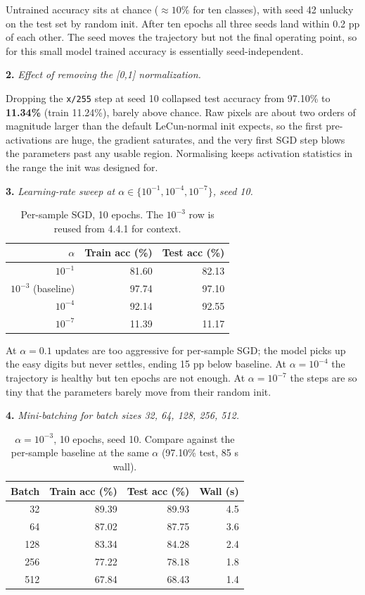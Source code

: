 \documentclass[11pt,a4paper]{article}
\newcommand{\Qpart}[1]{\textbf{#1.}}
\begin{document}
Untrained accuracy sits at chance ($\approx 10\%$ for ten classes), with seed 42 unlucky on the test set by random init. After ten epochs all three seeds land within 0.2 pp of each other. The seed moves the trajectory but not the final operating point, so for this small model trained accuracy is essentially seed-independent.

\Qpart{2} \textit{Effect of removing the [0,1] normalization.}

Dropping the \texttt{x/255} step at seed 10 collapsed test accuracy from 97.10\% to \textbf{11.34\%} (train 11.24\%), barely above chance. Raw pixels are about two orders of magnitude larger than the default LeCun-normal init expects, so the first pre-activations are huge, the gradient saturates, and the very first SGD step blows the parameters past any usable region. Normalising keeps activation statistics in the range the init was designed for.

\Qpart{3} \textit{Learning-rate sweep at \(\alpha \in \{10^{-1}, 10^{-4}, 10^{-7}\}\), seed 10.}

\begin{table}[h]
\centering
\small
\begin{tabular}{rrr}
\toprule
$\alpha$ & Train acc (\%) & Test acc (\%) \\
\midrule
$10^{-1}$ & 81.60 & 82.13 \\
$10^{-3}$ (baseline) & 97.74 & 97.10 \\
$10^{-4}$ & 92.14 & 92.55 \\
$10^{-7}$ & 11.39 & 11.17 \\
\bottomrule
\end{tabular}
\caption{Per-sample SGD, 10 epochs. The $10^{-3}$ row is reused from 4.4.1 for context.}
\end{table}

At $\alpha = 0.1$ updates are too aggressive for per-sample SGD; the model picks up the easy digits but never settles, ending 15 pp below baseline. At $\alpha = 10^{-4}$ the trajectory is healthy but ten epochs are not enough. At $\alpha = 10^{-7}$ the steps are so tiny that the parameters barely move from their random init.

\Qpart{4} \textit{Mini-batching for batch sizes 32, 64, 128, 256, 512.}

\begin{table}[h]
\centering
\small
\begin{tabular}{rrrr}
\toprule
Batch & Train acc (\%) & Test acc (\%) & Wall (s) \\
\midrule
32  & 89.39 & 89.93 & 4.5 \\
64  & 87.02 & 87.75 & 3.6 \\
128 & 83.34 & 84.28 & 2.4 \\
256 & 77.22 & 78.18 & 1.8 \\
512 & 67.84 & 68.43 & 1.4 \\
\bottomrule
\end{tabular}
\caption{$\alpha = 10^{-3}$, 10 epochs, seed 10. Compare against the per-sample baseline at the same $\alpha$ (97.10\% test, 85 s wall).}
\end{table}
\end{document}
